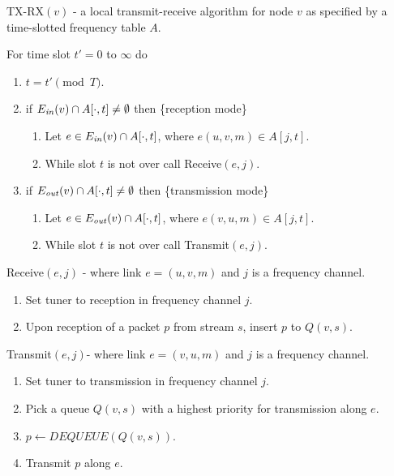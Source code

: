 \documentclass[12pt,oneside,english,a4paper]{book}
\theoremstyle{plain}
\theoremstyle{definition}
\theoremstyle{Theorem}
\theoremstyle{plain}
\newenvironment{proof sketch}[1]{\noindent {\emph{Proof sketch of #1:}}}{\hfill \qed}
\newcommand{\Ein}{E_{\text{\emph{in}}}}
\newcommand{\Eout}{E_{\text{\emph{out}}}}
\begin{document}
\begin{algorithm}[H]
  \caption{TX-RX$(v)$ - a local transmit-receive algorithm for node
    $v$ as specified by a time-slotted frequency table $A$.}
\label{alg:tx-rx}
For time slot $t'=0$ to $\infty$ do
  \begin{enumerate}%
\item $t = t' \pmod T$.
  \item if $\Ein(v)\cap A[\cdot,t ]\neq \emptyset$ then
    \{reception mode\}
    \begin{enumerate}%
    \item Let $e\in \Ein(v)\cap A[\cdot,t]$, where $e(u,v,m)\in
      A[j,t]$.
    \item While slot $t$ is not over call Receive$(e,j)$.
    \end{enumerate}%
  \item if $\Eout(v)\cap A[\cdot,t ]\neq \emptyset$ then
    \{transmission mode\}
    \begin{enumerate}%
    \item Let $e\in \Eout(v)\cap A[\cdot,t ]$, where
      $e(v,u,m)\in A[j,t]$.
    \item While slot $t$ is not over call Transmit$(e,j)$.
    \end{enumerate}%
  \end{enumerate}%
Receive$(e,j)$ - where link $e=(u,v,m)$ and $j$ is a frequency channel.
\begin{enumerate}
\item Set tuner to reception in frequency channel $j$.
\item Upon reception of a packet $p$ from stream $s$, insert $p$ to $Q(v,s)$.
\end{enumerate}

Transmit$(e,j)$-  where link $e=(v,u,m)$ and $j$ is a frequency channel.
\begin{enumerate}
\item Set tuner to transmission in frequency channel $j$.
\item\label{line:priority} Pick a queue $Q(v,s)$ with a highest priority for transmission along $e$.
\item $p \gets DEQUEUE(Q(v,s))$.
\item Transmit $p$ along $e$.
\end{enumerate}
\end{algorithm}
\end{document}
